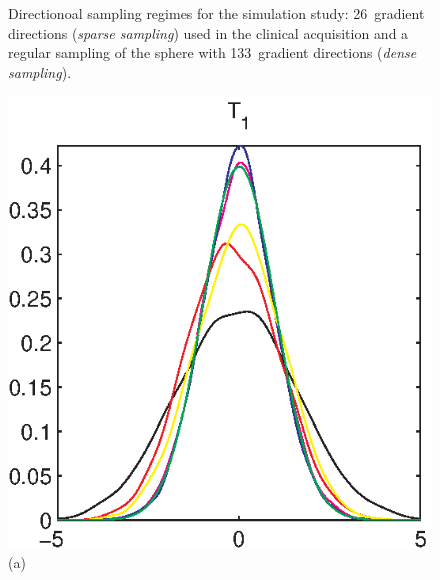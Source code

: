 \documentclass[authoryear,preprint,12pt]{elsarticle}
\begin{document}
\begin{figure}[tbp]
\begin{center}
\begin{minipage}[]{0.45\textwidth}
    \end{minipage}
  \end{center}
  \caption{Directionoal sampling regimes for the simulation study:
    26~gradient directions (\textit{sparse sampling}) used in the
    clinical acquisition \citep{DKJones99} and a regular sampling of
    the sphere with 133~gradient directions (\textit{dense
      sampling}).}
  \label{fig:sampling}
\end{figure}

\begin{figure}[tbp]
  \begin{center}
    \begin{minipage}[]{0.45\textwidth}
      \centering
      \includegraphics[width=\textwidth]{mrmcomplex14ny.eps}
      (a)
    \end{minipage}
    \begin{minipage}[]{0.45\textwidth}
      \centering

\end{minipage}
\end{center}
\end{figure}
\end{document}
